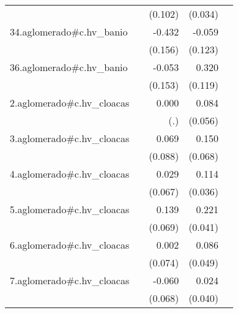 {\begin{longtable}{l*{4}{D{.}{.}{-1}}}
            &                     &     (0.102)         &     (0.034)         &                     \\
\addlinespace
34.aglomerado#c.hv\_banio&                     &      -0.432\sym{**} &      -0.059         &                     \\
            &                     &     (0.156)         &     (0.123)         &                     \\
\addlinespace
36.aglomerado#c.hv\_banio&                     &      -0.053         &       0.320\sym{**} &                     \\
            &                     &     (0.153)         &     (0.119)         &                     \\
\addlinespace
2.aglomerado#c.hv\_cloacas&                     &       0.000         &       0.084         &                     \\
            &                     &         (.)         &     (0.056)         &                     \\
\addlinespace
3.aglomerado#c.hv\_cloacas&                     &       0.069         &       0.150\sym{*}  &                     \\
            &                     &     (0.088)         &     (0.068)         &                     \\
\addlinespace
4.aglomerado#c.hv\_cloacas&                     &       0.029         &       0.114\sym{**} &                     \\
            &                     &     (0.067)         &     (0.036)         &                     \\
\addlinespace
5.aglomerado#c.hv\_cloacas&                     &       0.139\sym{*}  &       0.221\sym{***}&                     \\
            &                     &     (0.069)         &     (0.041)         &                     \\
\addlinespace
6.aglomerado#c.hv\_cloacas&                     &       0.002         &       0.086         &                     \\
            &                     &     (0.074)         &     (0.049)         &                     \\
\addlinespace
7.aglomerado#c.hv\_cloacas&                     &      -0.060         &       0.024         &                     \\
            &                     &     (0.068)         &     (0.040)         &                     \\

\end{longtable}}

